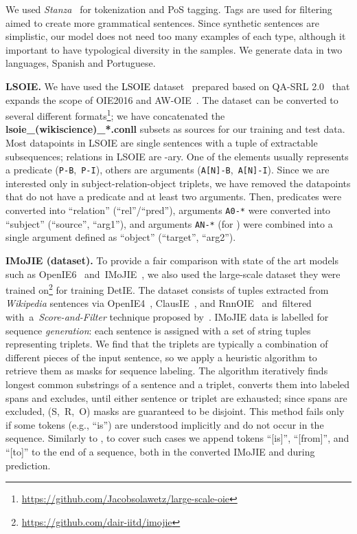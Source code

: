 \documentclass[letterpaper]{article} \usepackage{aaai22}  \usepackage{times}  \usepackage{helvet}  \usepackage{courier}  \usepackage[hyphens]{url}  \usepackage{graphicx} \usepackage{placeins}
\newcommand{\camera}[1]{\textcolor{black}{#1}}
\begin{document}
We used \emph{Stanza}~\cite{qi2020stanza} for tokenization and PoS tagging. Tags are used for filtering aimed to create more grammatical sentences. Since synthetic sentences are simplistic, our model does not need too many examples of each type, although it important to have typological diversity in the samples. We generate data in two languages, Spanish and Portuguese.



\textbf{LSOIE.}
We have used the \camera{LSOIE} dataset~\cite{lsoie-2021} prepared based on QA-SRL 2.0~\cite{fitzgerald2018large} that expands the scope of OIE2016 and AW-OIE~\cite{stanovsky-etal-2018-supervised}.
The dataset can be converted to several different formats\footnote{\url{https://github.com/Jacobsolawetz/large-scale-oie}}; we have concatenated the \textbf{ lsoie\_(wikiscience)\_*.conll} subsets as sources for our training and test data. Most datapoints in LSOIE are single sentences with a tuple of extractable subsequences; relations in LSOIE are -ary. One of the elements usually represents a predicate ({\tt P-B},~{\tt P-I}), others are arguments ({\tt A[N]-B},~{\tt A[N]-I}). 
Since we are interested only in subject-relation-object triplets, we have removed the datapoints that do not have a predicate and at least two arguments. Then, predicates
were converted into ``relation'' (``rel''/``pred''), arguments 
{\tt A0-*} 
were converted into ``subject'' (``source'', ``arg1''), and  arguments {\tt AN-*} (for ) were combined
into a single argument defined as ``object'' (``target'', ``arg2''). 

\textbf{IMoJIE (dataset).}
To provide a fair comparison with state of the art models such as OpenIE6~\cite{kolluru2020openie6} and~IMoJIE~\cite{kolluru2020imojie}, we also used the large-scale dataset they were trained on\footnote{\url{https://github.com/dair-iitd/imojie}} for training DetIE. The dataset consists of tuples extracted from \emph{Wikipedia} sentences via OpenIE4~\cite{christensen2011analysis}, ClausIE~\cite{del2013clausie}, and RnnOIE~\cite{stanovsky-etal-2018-supervised} and~filtered with~a~\textit{Score-and-Filter} technique proposed by~\citet{kolluru2020imojie}.
IMoJIE data is labelled for sequence \textit{generation}: each sentence is assigned with a set of string tuples representing triplets. We find that the triplets are typically
a combination of different pieces of the input sentence, so we apply a heuristic algorithm to retrieve them as masks for sequence labeling.
The algorithm iteratively finds longest common substrings of a sentence and a triplet, converts them into labeled spans and excludes, until either sentence or triplet are exhausted; since spans are excluded, (S,~R,~O) masks are guaranteed to be disjoint. 
This method fails only if some tokens (e.g., ``is'') are understood implicitly and do not occur in the sequence.
Similarly to \citet{kolluru2020openie6}, to cover such cases we append tokens ``[is]'', ``[from]'', and ``[to]'' to the end of a sequence, both in the converted IMoJIE and during prediction.
\end{document}
